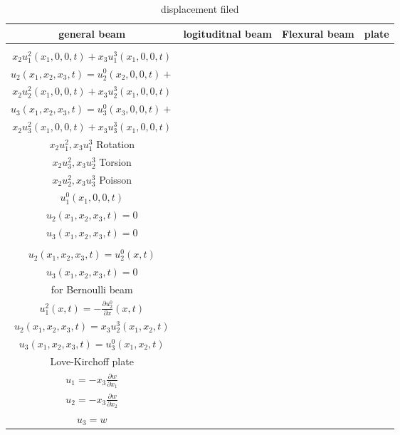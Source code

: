 \documentclass{article}
\begin{document}
\begin{multicols*}{2}
\begin{itemize}
  \begin{table*}
    \centering
    \caption{displacement filed}
    \begin{tabular}{|c|c|c|c|}
      \hline
      general beam & logituditnal beam  & Flexural beam & plate\\
      \hline
      \makecell[c]{
        $u_{1}(x_{1},x_{2},x_{3},t)=u_{1}^{0}(x_{1},0,0,t)+$\\$x_{2}u_{1}^{2}(x_{1},0,0,t)+x_{3}u_{1}^{3}(x_{1},0,0,t)$\\
        $u_{2}(x_{1},x_{2},x_{3},t)=u_{2}^{0}(x_{2},0,0,t)+$\\$x_{2}u_{2}^{2}(x_{1},0,0,t)+x_{3}u_{2}^{3}(x_{1},0,0,t)$\\
        $u_{3}(x_{1},x_{2},x_{3},t)=u_{3}^{0}(x_{3},0,0,t)+$\\$x_{2}u_{3}^{2}(x_{1},0,0,t)+x_{3}u_{3}^{3}(x_{1},0,0,t)$\\
        $x_{2}u_1^2, x_{3}u_1^3$ Rotation \\
        $x_{2}u_3^2, x_{3}u_2^3$ Torsion \\
        $x_{2}u_2^2, x_{3}u_3^3$ Poisson 
      }
      &\makecell[c]{
        $u_{1}(x_{1},x_{2},x_{3},t)=$\\$u_{1}^{0}(x_{1},0,0,t)$\\
        $u_{2}(x_{1},x_{2},x_{3},t)=0$\\
        $u_{3}(x_{1},x_{2},x_{3},t)=0$\\
      }
      &\makecell[c]{
        $u_{1}(x_{1},x_{2},x_{3},t)=x_{2}u_{1}^{2}(x_{1},t)$\\
        $u_{2}(x_{1},x_{2},x_{3},t)=u_{2}^{0}(x,t)$\\
        $u_{3}(x_{1},x_{2},x_{3},t)=0$\\
        for Bernoulli beam \\
        $u_{1}^{2}(x,t)=-\frac{\partial u_{2}^{0}}{\partial x}(x,t)$
      }
      &\makecell[c]{
        $u_{1}(x_{1},x_{2},x_{3},t)=x_{3}u_{1}^{3}(x_{1},x_{2},t)$\\
        $u_{2}(x_{1},x_{2},x_{3},t)=x_{3}u_{2}^{3}(x_{1},x_{2},t)$\\
        $u_{3}(x_{1},x_{2},x_{3},t)=u_{3}^{0}(x_{1},x_{2},t)$\\
        Love-Kirchoff plate\\
        $u_{1}=-x_{3}\frac{\partial w}{\partial x_{1}}$\\
        $u_{2}=-x_{3}\frac{\partial w}{\partial x_{2}}$\\
        $u_{3}=w$
      }\\
      \hline
    \end{tabular}
  \end{table*}
  \end{itemize}

\end{multicols*}
\end{document}
